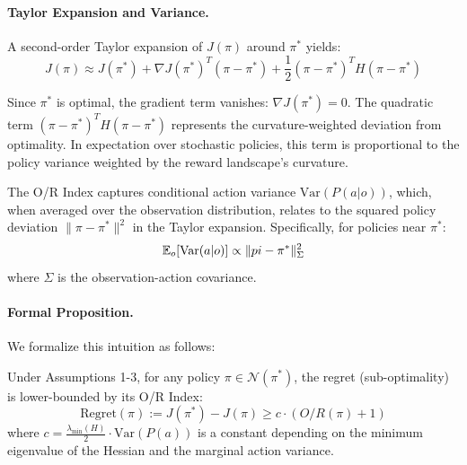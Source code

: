 \paragraph{Taylor Expansion and Variance.}
A second-order Taylor expansion of $J(\pi)$ around $\pi^*$ yields:
\begin{equation}
J(\pi) \approx J(\pi^*) + \nabla J(\pi^*)^T (\pi - \pi^*) + \frac{1}{2} (\pi - \pi^*)^T H (\pi - \pi^*)
\end{equation}

Since $\pi^*$ is optimal, the gradient term vanishes: $\nabla J(\pi^*) = 0$. The quadratic term $(\pi - \pi^*)^T H (\pi - \pi^*)$ represents the curvature-weighted deviation from optimality. In expectation over stochastic policies, this term is proportional to the policy variance weighted by the reward landscape's curvature.

The O/R Index captures conditional action variance $\text{Var}(P(a|o))$, which, when averaged over the observation distribution, relates to the squared policy deviation $\|\pi - \pi^*\|^2$ in the Taylor expansion. Specifically, for policies near $\pi^*$:
\begin{equation}
\mathbb{E}_{o}[\text{Var}(a|o)] \propto \|\\pi - \pi^*\|^2_{\Sigma}
\end{equation}
where $\Sigma$ is the observation-action covariance.

\paragraph{Formal Proposition.}
We formalize this intuition as follows:

\begin{proposition}
\label{prop:variance_regret}
Under Assumptions 1-3, for any policy $\pi \in \mathcal{N}(\pi^*)$, the regret (sub-optimality) is lower-bounded by its O/R Index:
\begin{equation}
\text{Regret}(\pi) := J(\pi^*) - J(\pi) \geq c \cdot (O/R(\pi) + 1)
\end{equation}
where $c = \frac{\lambda_{\min}(H)}{2} \cdot \text{Var}(P(a))$ is a constant depending on the minimum eigenvalue of the Hessian and the marginal action variance.
\end{proposition}

